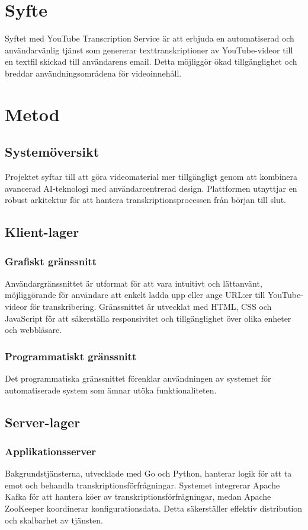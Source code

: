 \section{Syfte}
Syftet med YouTube Transcription Service är att erbjuda en automatiserad och
användarvänlig tjänst som genererar texttranskriptioner av YouTube-videor till
en textfil skickad till användarens email. Detta möjliggör ökad tillgänglighet
och breddar användningsområdena för videoinnehåll.

\section{Metod}

\subsection{Systemöversikt}
Projektet syftar till att göra videomaterial mer tillgängligt genom att
kombinera avancerad AI-teknologi med användarcentrerad design. Plattformen
utnyttjar en robust arkitektur för att hantera transkriptionsprocessen från
början till slut.

\subsection{Klient-lager}

\subsubsection{Grafiskt gränssnitt}
Användargränssnittet är utformat för att vara intuitivt och lättanvänt,
möjliggörande för användare att enkelt ladda upp eller ange URL:er till
YouTube-videor för transkribering. Gränssnittet är utvecklat med HTML, CSS och
JavaScript för att säkerställa responsivitet och tillgänglighet över olika
enheter och webbläsare.

\subsubsection{Programmatiskt gränssnitt}
Det programmatiska gränssnittet förenklar användningen av systemet för
automatiserade system som ämnar utöka funktionaliteten. 

\subsection{Server-lager}

\subsubsection{Applikationsserver}
Bakgrundstjänsterna, utvecklade med Go och Python,
hanterar logik för att ta emot och behandla transkriptionsförfrågningar.
Systemet integrerar Apache Kafka för att hantera köer av
transkriptionsförfrågningar, medan Apache ZooKeeper koordinerar
konfigurationsdata. Detta säkerställer effektiv distribution och skalbarhet av
tjänsten.
